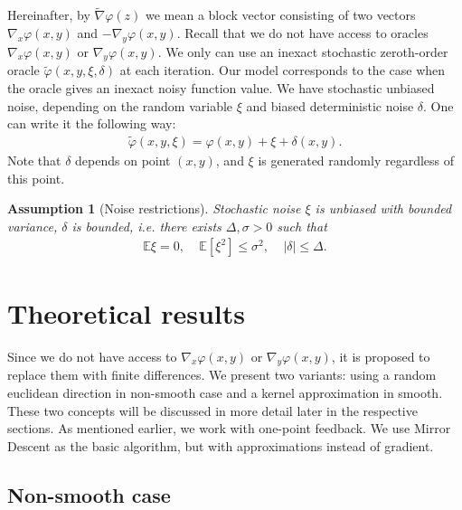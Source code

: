 \documentclass[runningheads]{llncs}
\newtheorem{assumption}{Assumption}
\newcommand{\EE}{\mathbf{E}}
\def\EE{\mathbb E}
\begin{document}
Hereinafter, by $\tilde \nabla \varphi(z)$ we mean a block vector consisting of two vectors $\nabla_x \varphi(x,y)$ and $-\nabla_y \varphi(x,y)$.
Recall that we do not have access to oracles $\nabla_x {\varphi}(x,y)$ or $\nabla_y {\varphi}(x,y)$. We only can use an inexact stochastic zeroth-order oracle $\tilde{\varphi}(x, y, \xi, \delta)$ at each iteration. Our model corresponds to the case when the oracle gives an inexact noisy function value. We have stochastic unbiased noise, depending on the random variable $\xi$ and biased deterministic noise $\delta$. One can write it the following way:
\begin{eqnarray}
\label{PrSt1}
    \tilde \varphi (x,y, \xi)  = \varphi(x,y) + \xi + \delta(x,y).
\end{eqnarray}
Note that $\delta$ depends on point $(x, y)$, and $\xi$ is generated randomly regardless of this point.

\begin{assumption}[Noise restrictions]\label{noise_restrictions} Stochastic noise $\xi$ is unbiased with bounded variance, $\delta$ is bounded, i.e. there exists $\Delta, \sigma >0$ such that
\begin{eqnarray}
\label{eq:PrSt2}
    \EE\xi =0, ~~~~~\EE\left[\xi^2\right] \leq \sigma^2, ~~~~~ |\delta|\leq \Delta.
\end{eqnarray}
\end{assumption}

\section{Theoretical results}

Since we do not have access to $\nabla_x {\varphi}(x,y)$ or $\nabla_y {\varphi}(x,y)$, it is proposed to replace them with finite differences. We present two variants: using a random euclidean direction \cite{Shamir15,gasnikov2017stochastic} in non-smooth case and a kernel approximation \cite{akhavan2020exploiting,novitskii2021improved} in smooth. These two concepts will be discussed in more detail later in the respective sections. As mentioned earlier, we work with one-point feedback.
We use Mirror Descent as the basic algorithm, but with approximations instead of gradient.

\subsection{Non-smooth case} \label{31}
\end{document}

